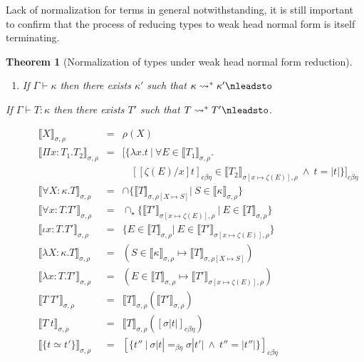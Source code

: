\documentclass{article}
\newcommand{\choice}[0]{\zeta}
\newcommand{\elcap}[0]{\cap}
\newcommand{\interp}[1]{\llbracket #1 \rrbracket}
\newcommand{\cbe}[0]{c\beta\eta}
\newtheorem{theorem}{Theorem}
\begin{document}
Lack of normalization for terms in general notwithstanding, it is still
important to confirm that the process of reducing types to weak head normal form
is itself terminating.
\begin{theorem}[Normalization of types under weak head normal form reduction]
  \label{thm:type-norm}
  \
  \begin{enumerate}
  \item If \(\Gamma \vdash \kappa\) then there exists \(\kappa'\) such that
    \(\kappa \leadsto^* \kappa' \nleadsto\)
  \end{enumerate} If \(\Gamma \vdash T : \kappa\) then there exists \(T'\) such
  that \(T \leadsto^* T' \nleadsto\).
\end{theorem}

\begin{figure}
\[
\begin{array}{lll}
\interp{X}_{\sigma,\rho} & = & \rho(X) \\ 
\interp{\Pi x : T_1. T_2}_{\sigma,\rho} & = & 
    [\{ \lambda x.t\ |\ \forall E\in\interp{T_1}_{\sigma,\rho}.\\
\ &\ &\ \ \ \  [[\choice(E)/x]t]_{\cbe}\in\interp{T_2}_{\sigma[x\mapsto \choice(E)],\rho} \ \wedge\ t = |t|\}]_{\cbe}
 \\
\interp{\forall X:\kappa.T}_{\sigma,\rho} & = & 
  \elcap \{ \interp{T}_{\sigma,\rho[X\mapsto S]} |\ S\in\interp{\kappa}_{\sigma,\rho} \}  \\ 
\interp{\forall x:T.T'}_{\sigma,\rho} & = & 
  \elcap_\star \{ \interp{T'}_{\sigma[x\mapsto \choice(E)],\rho}\ |\ E\in\interp{T}_{\sigma,\rho} \} \\ 
\interp{\iota x:T.T'}_{\sigma,\rho} & = & \{ E\in\interp{T}_{\sigma,\rho} |\ E \in \interp{T'}_{\sigma[x\mapsto \choice(E)],\rho} \} \\ 
\interp{\lambda X:\kappa.T}_{\sigma,\rho} & = & (S\in\interp{\kappa}_{\sigma,\rho} \mapsto \interp{T}_{\sigma,\rho[X\mapsto S]}) 
\\ 
\interp{\lambda x:T.T'}_{\sigma,\rho} & = & 
    (E\in\interp{T}_{\sigma,\rho} \mapsto \interp{T'}_{\sigma[x\mapsto \choice(E)],\rho}) 
\\ 
\interp{T\ T'}_{\sigma,\rho} & = & \interp{T}_{\sigma,\rho}(\interp{T'}_{\sigma,\rho})
\\ 
\interp{T\ t}_{\sigma,\rho} & = & \interp{T}_{\sigma,\rho}([\sigma |t|]_{\cbe})
\\
\interp{\{t \simeq t'\}}_{\sigma,\rho} & = & [\{ t''\ |\ \sigma |t| =_{\beta\eta} \sigma |t'|\ \wedge\ t'' = |t''| \}]_{\cbe} \\

\end{array}\]
\end{figure}
\end{document}
